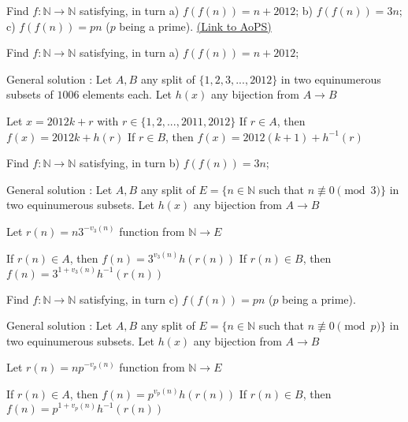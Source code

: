 \begin{problem}
	Find $f: \mathbb{N} \rightarrow  \mathbb{N}$ satisfying, in turn
a) $f(f(n)) = n + 2012$;
b) $f(f(n)) = 3n$;
c) $f(f(n)) = pn$ ($p$ being a prime).
	\flushright \href{https://artofproblemsolving.com/community/c6h538089}{(Link to AoPS)}
\end{problem}



\begin{solution}
	\begin{tcolorbox}Find $f: \mathbb{N} \rightarrow  \mathbb{N}$ satisfying, in turn
a) $f(f(n)) = n + 2012$;\end{tcolorbox}
General solution :
Let $A,B$ any split of $\{1,2,3,...,2012\}$ in two equinumerous subsets of $1006$ elements each.
Let $h(x)$ any bijection from $A\to B$

Let $x=2012k+r$ with $r\in\{1,2,...,2011,2012\}$
If $r\in A$, then $f(x)=2012k+h(r)$
If $r\in B$, then $f(x)=2012(k+1)+h^{-1}(r)$
\end{solution}



\begin{solution}
	\begin{tcolorbox}Find $f: \mathbb{N} \rightarrow  \mathbb{N}$ satisfying, in turn
b) $f(f(n)) = 3n$;\end{tcolorbox}
General solution :
Let $A,B$ any split of $E=\{n\in\mathbb N$ such that $n\not\equiv 0\pmod 3\}$ in two equinumerous subsets.
Let $h(x)$ any bijection from $A\to B$

Let $r(n)=n3^{-v_3(n)}$ function from $\mathbb N\to E$

If $r(n)\in A$, then $f(n)=3^{v_3(n)}h(r(n))$
If $r(n)\in B$, then $f(n)=3^{1+v_3(n)}h^{-1}(r(n))$
\end{solution}



\begin{solution}
	\begin{tcolorbox}Find $f: \mathbb{N} \rightarrow  \mathbb{N}$ satisfying, in turn
c) $f(f(n)) = pn$ ($p$ being a prime).\end{tcolorbox}
General solution :
Let $A,B$ any split of $E=\{n\in\mathbb N$ such that $n\not\equiv 0\pmod p\}$ in two equinumerous subsets.
Let $h(x)$ any bijection from $A\to B$

Let $r(n)=np^{-v_p(n)}$ function from $\mathbb N\to E$

If $r(n)\in A$, then $f(n)=p^{v_p(n)}h(r(n))$
If $r(n)\in B$, then $f(n)=p^{1+v_p(n)}h^{-1}(r(n))$
\end{solution}



